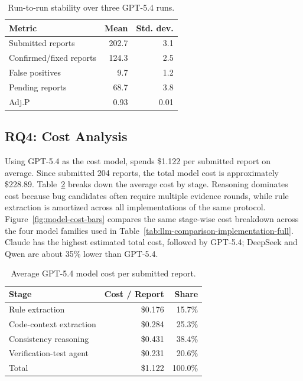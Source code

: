 \begin{table}[t]
\centering
\caption{Run-to-run stability over three GPT-5.4 runs.}
\label{tab:stability}
\small
\begin{tabular}{lrr}
\toprule
\textbf{Metric} & \textbf{Mean} & \textbf{Std. dev.} \\
\midrule
Submitted reports & 202.7 & 3.1 \\
Confirmed/fixed reports & 124.3 & 2.5 \\
False positives & 9.7 & 1.2 \\
Pending reports & 68.7 & 3.8 \\
Adj.P & 0.93 & 0.01 \\
\bottomrule
\end{tabular}
\end{table}

\FloatBarrier

\subsection{RQ4: Cost Analysis}

Using GPT-5.4 as the cost model, \tool{} spends \$1.122 per submitted report on
average. Since \tool{} submitted 204 reports, the total model cost is
approximately \$228.89. Table~\ref{tab:cost} breaks down the average cost by
stage. Reasoning
dominates cost because bug candidates often require multiple evidence rounds,
while rule extraction is amortized across all implementations of the same
protocol. Figure~\ref{fig:model-cost-bars} compares the same stage-wise cost
breakdown across the four model families used in
Table~\ref{tab:llm-comparison-implementation-full}. Claude has the highest
estimated total cost, followed by GPT-5.4; DeepSeek and Qwen are about 35\%
lower than GPT-5.4.

\begin{table}[t]
\centering
\caption{Average GPT-5.4 model cost per submitted report.}
\label{tab:cost}
\small
\begin{tabular}{lrr}
\toprule
\textbf{Stage} & \textbf{Cost / Report} & \textbf{Share} \\
\midrule
Rule extraction & \$0.176 & 15.7\% \\
Code-context extraction & \$0.284 & 25.3\% \\
Consistency reasoning & \$0.431 & 38.4\% \\
Verification-test agent & \$0.231 & 20.6\% \\
\midrule
Total & \$1.122 & 100.0\% \\
\bottomrule
\end{tabular}
\end{table}

